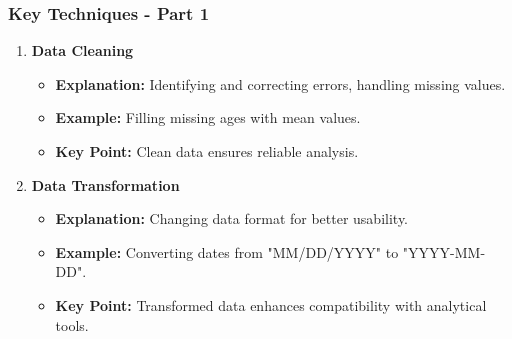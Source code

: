\documentclass[aspectratio=169]{beamer}
\begin{document}
\begin{frame}[fragile]
    \frametitle{Key Techniques - Part 1}

    \begin{enumerate}
        \item \textbf{Data Cleaning}
        \begin{itemize}
            \item \textbf{Explanation:} Identifying and correcting errors, handling missing values.
            \item \textbf{Example:} Filling missing ages with mean values.
            \item \textbf{Key Point:} Clean data ensures reliable analysis.
        \end{itemize}

        \item \textbf{Data Transformation}
        \begin{itemize}
            \item \textbf{Explanation:} Changing data format for better usability.
            \item \textbf{Example:} Converting dates from "MM/DD/YYYY" to "YYYY-MM-DD".
            \item \textbf{Key Point:} Transformed data enhances compatibility with analytical tools.
        \end{itemize}
    \end{enumerate}
\end{frame}
\end{document}
